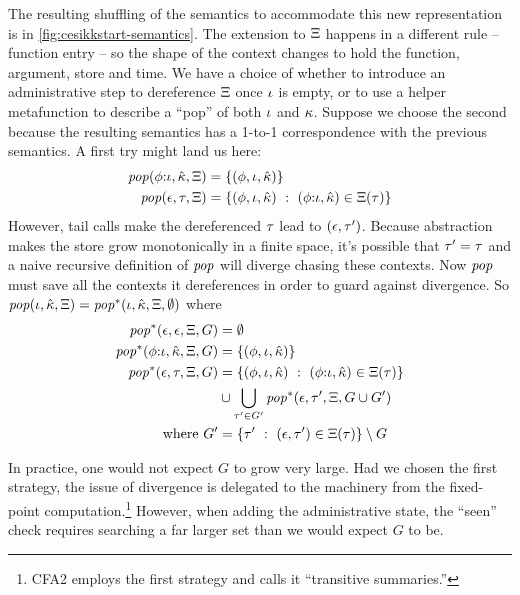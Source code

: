 The resulting shuffling of the semantics to accommodate this new representation is in \autoref{fig:cesikkstart-semantics}.
%
The extension to $\Xi$ happens in a different rule -- function entry -- so the shape of the context changes to hold the function, argument, store and time.
%
We have a choice of whether to introduce an administrative step to dereference $\Xi$ once $\iota$ is empty, or to use a helper metafunction to describe a ``pop'' of both $\iota$ and $\kappa$.
%
Suppose we choose the second because the resulting semantics has a 1-to-1 correspondence with the previous semantics.
%
A first try might land us here:
\begin{align*}
  \mathit{pop}(\phi{\tt :} \iota,\hat{\kappa},\Xi) &= \{ (\phi,\iota,\hat{\kappa}) \} \\
  \mathit{pop}(\epsilon,\tau,\Xi) &= \{ (\phi,\iota,\hat{\kappa})\ :\ (\phi{\tt :} \iota, \hat{\kappa}) \in \Xi(\tau)\}
\end{align*}
However, tail calls make the dereferenced $\tau$ lead to $(\epsilon,\tau')$.
%
Because abstraction makes the store grow monotonically in a finite space, it's possible that $\tau' = \tau$ and a naive recursive definition of $\mathit{pop}$ will diverge chasing these contexts.
%
Now $\mathit{pop}$ must save all the contexts it dereferences in order to guard against divergence.
%
So $\mathit{pop}(\iota,\hat{\kappa},\Xi) = \mathit{pop}^*(\iota,\hat{\kappa},\Xi,\emptyset)$ where
\begin{align*}
  \mathit{pop}^*(\epsilon,\epsilon,\Xi,G) &= \emptyset \\
  \mathit{pop}^*(\phi{\tt :} \iota,\hat{\kappa},\Xi,G) &= \{ (\phi,\iota,\hat{\kappa}) \} \\
  \mathit{pop}^*(\epsilon,\tau,\Xi,G) &= \{ (\phi,\iota,\hat{\kappa})\ :\ (\phi{\tt :} \iota, \hat{\kappa}) \in \Xi(\tau)\} \\
  &\cup \bigcup\limits_{\tau' \in G'}\mathit{pop}^*(\epsilon,\tau',\Xi,G\cup G') \\
  \text{where } G' &= \{ \tau'\ :\ (\epsilon,\tau') \in \Xi(\tau)\} \setminus G
\end{align*}

In practice, one would not expect $G$ to grow very large.
%
Had we chosen the first strategy, the issue of divergence is delegated to the machinery from the fixed-point computation.\footnote{CFA2 employs the first strategy and calls it ``transitive summaries.''}
%
However, when adding the administrative state, the ``seen'' check requires searching a far larger set than we would expect $G$ to be.

